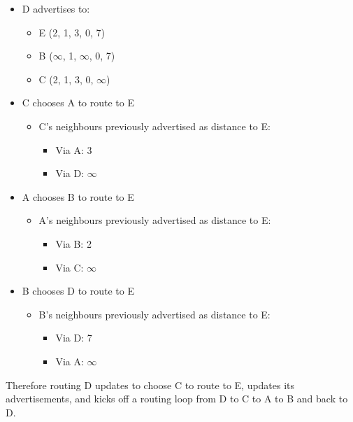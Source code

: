 \documentclass[12pt]{article}
\begin{document}
\begin{itemize}
\item D advertises to:
\begin{itemize}
\item E (2, 1, 3, 0, 7)
\item B ($\infty$, 1, $\infty$, 0, 7)
\item C (2, 1, 3, 0, $\infty$)
\end{itemize}
\item C chooses A to route to E
\begin{itemize}
\item C’s neighbours previously advertised as distance to E:
\begin{itemize}
\item Via A: 3
\item Via D: $\infty$
\end{itemize}
\end{itemize}
\item A chooses B to route to E
\begin{itemize}
\item A’s neighbours previously advertised as distance to E:
\begin{itemize}
\item Via B: 2
\item Via C: $\infty$
\end{itemize}
\end{itemize}
\item B chooses D to route to E
\begin{itemize}
\item B’s neighbours previously advertised as distance to E:
\begin{itemize}
\item Via D: 7
\item Via A: $\infty$
\end{itemize}
\end{itemize}
\end{itemize}

Therefore routing D updates to choose C to route to E, updates its advertisements, and kicks off a routing loop from D to C to A to B and back to D.
\end{document}
